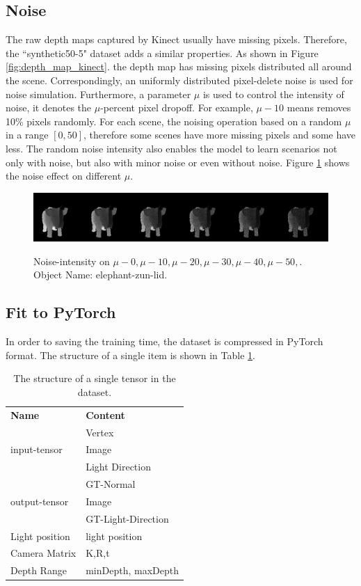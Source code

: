 \documentclass[border=15pt, multi, tikz]{article}
\newcommand{\tabhead}[1]{\textbf{#1}}
\begin{document}
\subsection{Noise}
\label{sec:noise}
The raw depth maps captured by Kinect usually have missing pixels. Therefore, the ``synthetic50-5" dataset adds a similar properties.
As shown in Figure \ref{fig:depth_map_kinect}. the depth map has missing pixels distributed all around the scene.  Correspondingly, an uniformly distributed pixel-delete noise is used for noise simulation. 
Furthermore, a parameter $ \mu $ is used to control the intensity of noise, it denotes the $ \mu $-percent pixel dropoff. For example, $ \mu-10 $ means removes 10\% pixels randomly. For each scene, the noising operation based on a random $ \mu $ in a range $ \left[0, 50\right] $, therefore some scenes have more missing pixels and some have less. The random noise intensity also enables the model to learn scenarios not only with noise, but also with minor noise or even without noise.
Figure \ref{fig:noise-intensity} shows the noise effect on different $ \mu $.
\begin{figure}[!h]
	\centering
	{\includegraphics[width=.9\textwidth]{./Figures/add_noise_depth.png}}
	\caption{Noise-intensity on $ \mu-0, \mu-10,\mu-20, \mu-30, \mu-40, \mu-50,$. Object Name: elephant-zun-lid.}
	\label{fig:noise-intensity}
\end{figure}


\subsection{Fit to PyTorch}
In order to saving the training time, the dataset is compressed in PyTorch format. The structure of a single item is shown in Table \ref{tab:tensor-structure}.
\begin{table}
	\caption{The structure of a single tensor in the dataset.}
	\label{tab:tensor-structure}
	\centering
	\begin{tabular}{l l}
		\tabhead{Name} & \tabhead{Content} \\
		\multirow{3}{*}{input-tensor}  & Vertex \\  & Image \\  & Light Direction \\
		\hline
		\multirow{3}{*}{output-tensor}  & GT-Normal \\ & Image \\ & GT-Light-Direction \\
		\hline
		Light position & light position \\
		\hline 
		Camera Matrix  & K,R,t\\
		\hline 
		Depth Range  & minDepth, maxDepth\\
	\end{tabular}
\end{table}
\end{document}

